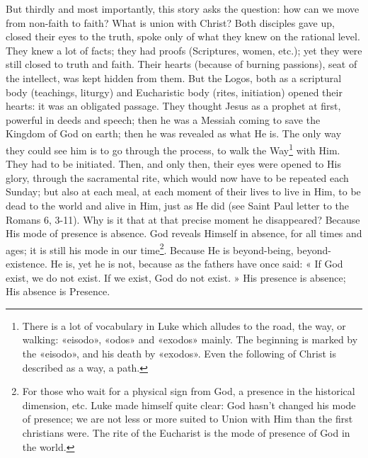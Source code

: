 But thirdly and most importantly, this story asks the question: how can we move from non-faith to faith? What is union with Christ? Both disciples gave up, closed their eyes to the truth, spoke only of what they knew on the rational level. They knew a lot of facts; they had proofs (Scriptures, women, etc.); yet they were still closed to truth and faith. Their hearts (because of burning passions), seat of the intellect, was kept hidden from them. But the Logos, both as a scriptural body (teachings, liturgy) and Eucharistic body (rites, initiation) opened their hearts: it was an obligated passage. They thought Jesus as a prophet at first, powerful in deeds and speech; then he was a Messiah coming to save the Kingdom of God on earth; then he was revealed as what He is. The only way they could see him is to go through the process, to walk the Way\footnote{There is a lot of vocabulary in Luke which alludes to the road, the way, or walking: «eisodo», «odos» and «exodos» mainly. The beginning is marked by the «eisodo», and his death by «exodos». Even the following of Christ is described as a way, a path.} with Him. They had to be initiated. Then, and only then, their eyes were opened to His glory, through the sacramental rite, which would now have to be repeated each Sunday; but also at each meal, at each moment of their lives to live in Him, to be dead to the world and alive in Him, just as He did (see Saint Paul letter to the Romans 6, 3-11). Why is it that at that precise moment he disappeared? Because His mode of presence is absence. God reveals Himself in absence, for all times and ages; it is still his mode in our time\footnote{For those who wait for a physical sign from God, a presence in the historical dimension, etc. Luke made himself quite clear: God hasn't changed his mode of presence; we are not less or more suited to Union with Him than the first christians were. The rite of the Eucharist is the mode of presence of God in the world.}. Because He is beyond-being, beyond-existence. He is, yet he is not, because as the fathers have once said: « If God exist, we do not exist. If we exist, God do not exist. » His presence is absence; His absence is Presence.


